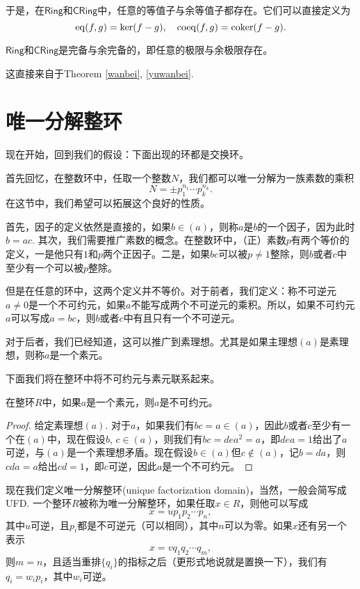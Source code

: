 于是，在$\mathsf{Ring}$和$\mathsf{CRing}$中，任意的等值子与余等值子都存在。它们可以直接定义为
\[
	\operatorname{eq}(f,g)=\ker(f-g),\quad \operatorname{coeq}(f,g)=\operatorname{coker}(f-g).
\]

\begin{thm}
$\mathsf{Ring}$和$\mathsf{CRing}$是完备与余完备的，即任意的极限与余极限存在。
\end{thm}

这直接来自于Theorem \ref{wanbei}, \ref{yuwanbei}.

\section{唯一分解整环}

现在开始，回到我们的假设：下面出现的环都是交换环。

\begin{para}
首先回忆，在整数环中，任取一个整数$N$，我们都可以唯一分解为一族素数的乘积
\[
	N=\pm p_1^{n_1}\cdots p_k^{n_k}.
\]
在这节中，我们希望可以拓展这个良好的性质。

首先，因子的定义依然是直接的，如果$b\in (a)$，则称$a$是$b$的一个因子，因为此时$b=ac$. 其次，我们需要推广素数的概念。在整数环中，（正）素数$p$有两个等价的定义，一是他只有$1$和$p$两个正因子。二是，如果$bc$可以被$p\neq 1$整除，则$b$或者$c$中至少有一个可以被$p$整除。

但是在任意的环中，这两个定义并不等价。对于前者，我们定义：称不可逆元$a\neq 0$是一个不可约元，如果$a$不能写成两个不可逆元的乘积。所以，如果不可约元$a$可以写成$a=bc$，则$b$或者$c$中有且只有一个不可逆元。

对于后者，我们已经知道，这可以推广到素理想。尤其是如果主理想$(a)$是素理想，则称$a$是一个素元。
\end{para}

下面我们将在整环中将不可约元与素元联系起来。

\begin{lem}
在整环$R$中，如果$a$是一个素元，则$a$是不可约元。
\end{lem}

\begin{proof}
给定素理想$(a)$. 对于$a$，如果我们有$bc=a\in (a)$，因此$b$或者$c$至少有一个在$(a)$中，现在假设$b$, $c\in (a)$，则我们有$bc=dea^2=a$，即$dea=1$给出了$a$可逆，与$(a)$是一个素理想矛盾。现在假设$b\in (a)$但$c\not\in (a)$，记$b=da$，则$cda=a$给出$cd=1$，即$c$可逆，因此$a$是一个不可约元。
\end{proof}

\begin{para}
现在我们定义唯一分解整环(unique factorization domain)，当然，一般会简写成UFD. 一个整环$R$被称为唯一分解整环，如果任取$x\in R$，则他可以写成
\[
	x=up_1p_2\cdots p_n,
\]
其中$u$可逆，且$p_i$都是不可逆元（可以相同），其中$n$可以为零。如果$x$还有另一个表示
\[
	x=vq_1q_2\cdots q_m,
\]
则$m=n$，且适当重排$\{q_i\}$的指标之后（更形式地说就是置换一下），我们有$q_i=w_ip_i$，其中$w_i$可逆。
\end{para}

